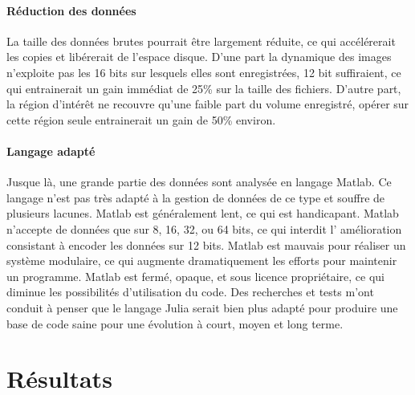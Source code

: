 
\paragraph{Réduction des données}
La taille des données brutes pourrait être largement réduite, ce qui accélérerait les copies et libérerait de l'espace disque. D'une part la dynamique des images n'exploite pas les 16 bits sur lesquels elles sont enregistrées, 12 bit suffiraient, ce qui entrainerait un gain immédiat de 25\% sur la taille des fichiers. D'autre part, la région d'intérêt ne recouvre qu'une faible part du volume enregistré, opérer sur cette région seule entrainerait un gain de 50\% environ.


\paragraph{Langage adapté}
Jusque là, une grande partie des données sont analysée en langage Matlab. Ce langage n'est pas très adapté à la gestion de données de ce type et souffre de plusieurs lacunes. Matlab est généralement lent, ce qui est handicapant. Matlab n'accepte de données que sur 8, 16, 32, ou 64 bits, ce qui interdit l' amélioration consistant à encoder les données sur 12 bits. Matlab est mauvais pour réaliser un système modulaire, ce qui augmente dramatiquement les efforts pour maintenir un programme. Matlab est fermé, opaque, et sous licence propriétaire, ce qui diminue les possibilités d'utilisation du code.
Des recherches et tests m'ont conduit à penser que le langage Julia serait bien plus adapté pour produire une base de code saine pour une évolution à court, moyen et long terme.


\section{Résultats}






